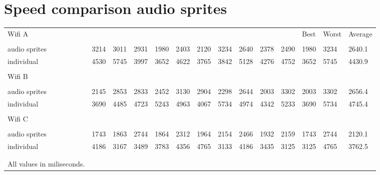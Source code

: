 \chapter{Speed comparison audio sprites}
\label{ch:speed-comparison}
\begin{landscape}
\begin{table}[h]
\begin{tabular}{llllllllllllll}
Wifi A                     &      &      &      &      &      &      &      &      &      &      & Best & Worst & Average \\
                           &      &      &      &      &      &      &      &      &      &      &      &       &         \\
audio sprites              & 3214 & 3011 & 2931 & 1980 & 2403 & 2120 & 3234 & 2640 & 2378 & 2490 & 1980 & 3234  & 2640.1  \\
individual                 & 4530 & 5745 & 3997 & 3652 & 4622 & 3765 & 3842 & 5128 & 4276 & 4752 & 3652 & 5745  & 4430.9  \\
                           &      &      &      &      &      &      &      &      &      &      &      &       &         \\
Wifi B                     &      &      &      &      &      &      &      &      &      &      &      &       &         \\
                           &      &      &      &      &      &      &      &      &      &      &      &       &         \\
audio sprites              & 2145 & 2853 & 2833 & 2452 & 3130 & 2904 & 2298 & 2644 & 2003 & 3302 & 2003 & 3302  & 2656.4  \\
individual                 & 3690 & 4485 & 4723 & 5243 & 4963 & 4067 & 5734 & 4974 & 4342 & 5233 & 3690 & 5734  & 4745.4  \\
                           &      &      &      &      &      &      &      &      &      &      &      &       &         \\
Wifi C                     &      &      &      &      &      &      &      &      &      &      &      &       &         \\
                           &      &      &      &      &      &      &      &      &      &      &      &       &         \\
audio sprites              & 1743 & 1863 & 2744 & 1864 & 2312 & 1964 & 2154 & 2466 & 1932 & 2159 & 1743 & 2744  & 2120.1  \\
individual                 & 4186 & 3167 & 3489 & 3783 & 4356 & 4765 & 3133 & 4186 & 3435 & 3125 & 3125 & 4765  & 3762.5  \\
                           &      &      &      &      &      &      &      &      &      &      &      &       &         \\
                           &      &      &      &      &      &      &      &      &      &      &      &       &         \\
All values in miliseconds. &      &      &      &      &      &      &      &      &      &      &      &       &        
\end{tabular}
\end{table}
\end{landscape}
